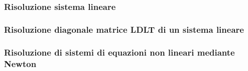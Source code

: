 \label{functcap3}
\subsubsection{Risoluzione sistema lineare}


\subsubsection{Risoluzione diagonale matrice LDLT di un sistema lineare}

\subsubsection{Risoluzione di sistemi di equazioni non lineari mediante Newton}


